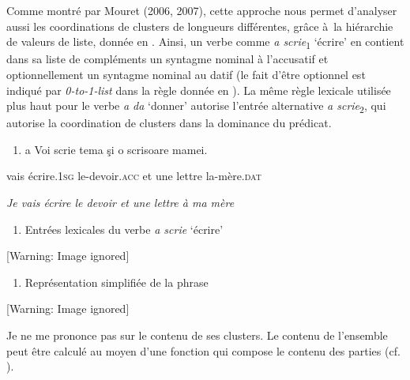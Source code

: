 Comme montré par Mouret (2006, 2007), cette approche nous permet d'analyser aussi les coordinations de clusters de longueurs différentes, grâce à~la hiérarchie de valeurs de liste, donnée en . Ainsi, un verbe comme \textit{a scrie}\textsubscript{1} `écrire' en  contient dans sa liste de compléments un syntagme nominal à l'accusatif et optionnellement un syntagme nominal au datif (le fait d'être optionnel est indiqué par \textit{0-to-1-list} dans la règle donnée en ). La même règle lexicale utilisée plus haut pour le verbe \textit{a da} `donner' autorise l'entrée alternative \textit{a scrie}\textsubscript{2}, qui autorise la coordination de clusters dans la dominance du prédicat.


\begin{enumerate}
\item \label{bkm:Ref300068528}a  Voi  scrie  tema  şi  o  scrisoare  mamei.


\end{enumerate}
vais\textsc{ } écrire.\textsc{1sg}  le-devoir.\textsc{acc}  et  une  lettre  la-mère.\textsc{dat}

{\itshape
Je vais écrire le devoir et une lettre à ma mère}


\begin{enumerate}
\item \label{bkm:Ref302433041}Entrées lexicales du verbe \textit{a scrie} `écrire'


\end{enumerate}
  [Warning: Image ignored] %
 


\begin{enumerate}
\item Représentation simplifiée de la phrase 


\end{enumerate}
  [Warning: Image ignored] %
 

Je ne me prononce pas sur le contenu de ses clusters. Le contenu de l'ensemble peut être calculé au moyen d'une fonction qui compose le contenu des parties (cf. \citet{Steedman2000}).

